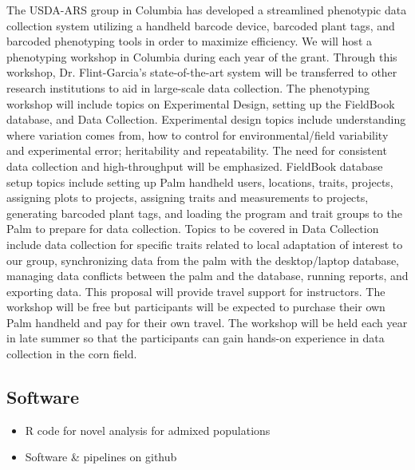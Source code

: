 The USDA-ARS group in Columbia has developed a streamlined phenotypic data collection system utilizing a handheld barcode device, barcoded plant tags, and barcoded phenotyping tools in order to maximize efficiency.  We will host a phenotyping workshop in Columbia during each year of the grant.  Through this workshop, Dr. Flint-Garcia’s state-of-the-art system will be transferred to other research institutions to aid in large-scale data collection. The phenotyping workshop will include topics on Experimental Design, setting up the FieldBook database, and Data Collection.  Experimental design topics include understanding where variation comes from, how to control for environmental/field variability and experimental error; heritability and repeatability.  The need for consistent data collection and high-throughput will be emphasized.  FieldBook database setup topics include setting up Palm handheld users, locations, traits, projects, assigning plots to projects, assigning traits and measurements to projects,  generating barcoded plant tags, and loading the program and trait groups to the Palm to prepare for data collection.  Topics to be covered in Data Collection include data collection for specific traits related to local adaptation of interest to our group, synchronizing data from the palm with the desktop/laptop database, managing data conflicts between the palm and the database, running reports, and exporting data.  This proposal will provide travel support for instructors.  The workshop will be free but participants will be expected to purchase their own Palm handheld and pay for their own travel.  The workshop will be held each year in late summer so that the participants can gain hands-on experience in data collection in the corn field.

\subsection*{Software} %
\begin{itemize}
\item R code for novel analysis for admixed populations
\item Software \& pipelines on github
\end{itemize}


